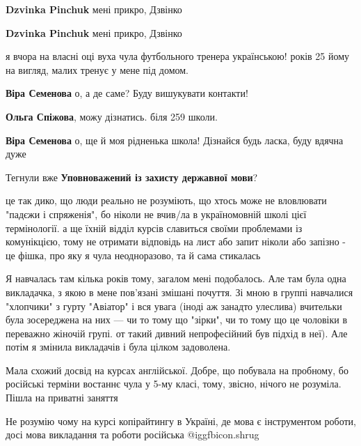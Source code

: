 \begin{itemize}
\begin{itemize} %
\textbf{Dzvinka Pinchuk} мені прикро, Дзвінко
\end{itemize} %

\textbf{Dzvinka Pinchuk} мені прикро, Дзвінко

\begin{itemize} %
я вчора на власні оці вуха чула футбольного тренера українською! років 25 йому на вигляд, малих тренує у мене під домом.

\textbf{Віра Семенова} о, а де саме? Буду вишукувати контакти!

\textbf{Ольга Спіжова}, можу дізнатись. біля 259 школи.

\textbf{Віра Семенова} о, ще й моя рідненька школа! Дізнайся будь ласка, буду вдячна дуже
\end{itemize} %

Тегнули вже \textbf{Уповноважений із захисту державної мови}?


це так дико, що люди реально не розуміють, що хтось може не вловлювати "падєжи
і спряженія", бо ніколи не вчив/ла в україномовній школі цієї термінології. а
ще їхній відділ курсів славиться своїми проблемами із комунікцією, тому не
отримати відповідь на лист або запит ніколи або запізно - це фішка, про яку я
чула неодноразово, та й сама стикалась


Я навчалась там кілька років тому, загалом мені подобалось. Але там була одна
викладачка, з якою в мене пов'язані змішані почуття. Зі мною в группі навчалися
"хлопчики" з гурту "Авіатор" і вся увага (іноді аж занадто улеслива) вчительки
була зосереджена на них — чи то тому що "зірки", чи то тому що це чоловіки в
переважно жіночій групі. от такий дивний непрофесійний був підхід в неї). Але
потім я змінила викладачів і була цілком задоволена.


Мала схожий досвід на курсах англійської. Добре, що побувала на пробному, бо
російські терміни востаннє чула у 5-му класі, тому, звісно, нічого не розуміла.
Пішла на приватні заняття



Не розумію чому на курсі копірайтингу в Україні, де мова є інструментом роботи,
досі мова викладання та роботи російська  @igg{fbicon.shrug} 


\end{itemize}
